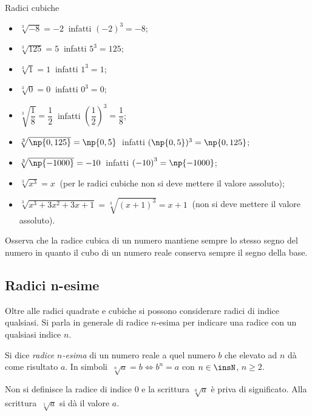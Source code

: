 \begin{exrig}
\begin{esempio}
Radici cubiche
 \begin{multicols}{2}
 \begin{itemize}
\item $\sqrt[3]{-8}=-2\:$ infatti $\left(-2\right)^3=-8$;
\item $\sqrt[3]{125}=5\:$ infatti $5^3=125$;
\item $\sqrt[3]{1}=1\:$ infatti $1^3=1$;
\item $\sqrt[3]{0}=0\:$ infatti $0^3=0$;
\item $\sqrt[3]{\dfrac{1}{8}}=\dfrac{1}{2}\:$ infatti $\left(\dfrac{1}{2}\right)^3=\dfrac{1}{8}$;
\item $\sqrt[3]{\np{0,125}}=\np{0,5}\:$ infatti $(\np{0,5})^3=\np{0,125}$;
\item $\sqrt[3]{\np{-1000}}=-10\:$ infatti $\left(-10\right)^3=\np{-1000}$;
\item $\sqrt[3]{x^3}=x\:$ (per le radici cubiche non si deve mettere il valore assoluto);
\item $\sqrt[3]{x^3+3x^2+3x+1}=\sqrt[3]{(x+1)^3}=x+1\:$ (non si deve mettere il valore assoluto).
\end{itemize}
\end{multicols}
\end{esempio}
\end{exrig}

Osserva che la radice cubica di un numero mantiene sempre lo stesso segno del numero in quanto il cubo di un numero reale conserva sempre il segno della base.

\subsection{Radici n-esime}

Oltre alle radici quadrate e cubiche si possono considerare radici di indice qualsiasi. Si parla in generale di radice $n$-esima per indicare una radice con un qualsiasi indice $n$.

\begin{definizione}
Si dice \emph{radice $n$-esima} di un numero reale a quel numero $b$ che elevato ad $n$ dà come risultato $a$.
In simboli~$\sqrt[n]{a}=b \Leftrightarrow b^n=a$ con $n\in \insN$, $n\ge 2$.

Non si definisce la radice di indice $0$ e la scrittura $\sqrt[0]{a}$ è priva di significato. Alla scrittura~$\sqrt[1]{a}$ si dà il valore $a$.
\end{definizione}

